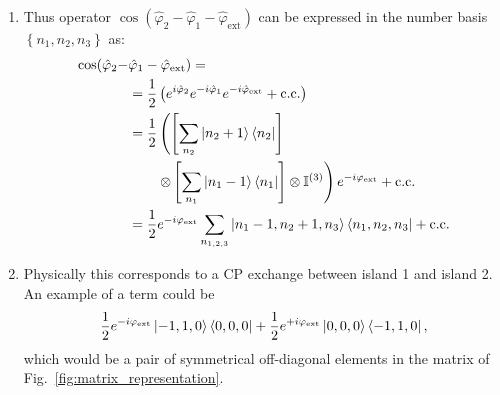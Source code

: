 \begin{enumerate}
\item Thus  operator $\cos(\hat{\varphi}_2-\hat{\varphi}_1-\hat{\varphi}_{\text{ext}})$ can be  expressed in the
  number basis $ \left\{n_{1},n_2,n_3\right\} $ as: {\scriptsize
    \begin{equation}
      \label{eq:ab4}
      \begin{aligned}
	\cos(\hat{\varphi}_2-& \hat{\varphi}_1-\hat{\varphi}_{\text{ext}}) =\\
        & = \frac{1}{2}\left(e^{i\hat{\varphi}_{2}}e^{-i\hat{\varphi}_1}e^{-i\hat{\varphi}_{\text{ext}}}+\text{c.c.}\right)\\
        & =  \frac{1}{2} \left(\left[\sum_{n_2}\ket{n_2+1}\bra{n_2}\right]\right. \\
        & \qquad \left.\otimes \left[\sum_{n_1}\ket{n_1-1}\bra{n_1}\right]
          \otimes\mathbb{I}^{(3)}\right)e^{-i\varphi_{\text{ext}}} + \text{c.c.}\\
        &             =              \frac{1}{2}e^{-i\varphi_{\text{ext}}}             \sum_{n_{1,2,3}}
        \ket{n_1-1,n_2+1,n_3}\bra{n_1,n_2,n_3} + \text{c.c.}
      \end{aligned}
    \end{equation}}
  
\item Physically this corresponds  to a CP exchange between island 1 and  island 2. An example
  of a term could be
  \begin{equation}
    \label{eq:ab6}
    \frac{1}{2}e^{-i\varphi_{\text{ext}}}\ket{-1,1,0}\bra{0,0,0} + \frac{1}{2}e^{+i\varphi_{\text{ext}}}\ket{0,0,0}\bra{-1,1,0},
  \end{equation}
  \noindent  which would  be a  pair of  symmetrical off-diagonal  elements in  the matrix  of
  Fig.~\ref{fig:matrix_representation}.
\end{enumerate}




